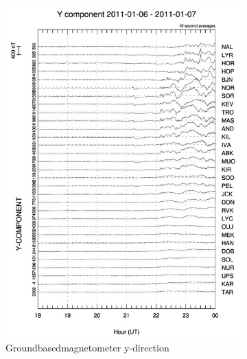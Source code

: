 \documentclass[10pt,a4paper]{article}
\begin{document}
\begin{figure}[h]
\begin{subfigure}{0.3\textwidth}
	\includegraphics[width=\textwidth]{Y_gram.jpg}
	\caption{ Groundbasedmagnetometer y-direction \label{GBM_Y}}
\end{subfigure}
\begin{subfigure}{0.3\textwidth}
\centering

\end{subfigure}
\end{figure}
\end{document}
